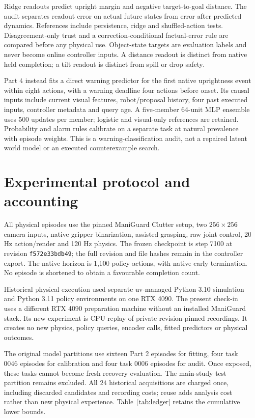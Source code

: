 \documentclass[sigconf,dvipsnames]{acmart}
\begin{document}
Ridge readouts predict upright margin and negative target-to-goal distance. The
audit separates readout error on actual future states from error after predicted
dynamics. References include persistence, ridge and shuffled-action tests.
Disagreement-only trust and a correction-conditional factual-error rule are compared
before any physical use. Object-state targets are evaluation labels and never
become online controller inputs. A distance readout is distinct from native held
completion; a tilt readout is distinct from spill or drop safety.

Part 4 instead fits a direct warning predictor for the first native uprightness
event within eight actions, with a warning deadline four actions before onset.
Its causal inputs include current visual features, robot/proposal history, four
past executed inputs, controller metadata and query age. A five-member 64-unit
MLP ensemble uses 500 updates per member; logistic and visual-only references are
retained. Probability and alarm rules calibrate on a separate task at natural
prevalence with episode weights. This is a warning-classification audit, not a
repaired latent world model or an executed counterexample search.

\section{Experimental protocol and accounting}
All physical episodes use the pinned ManiGuard Clutter setup, two $256\times256$
camera inputs, native gripper binarization, assisted grasping, raw joint control,
20 Hz action/render and 120 Hz physics. The frozen checkpoint is step 7100 at
revision \texttt{f572e33bdb49}; the full revision and file hashes remain in the
controller export. The native horizon is 1,100 policy actions, with native early
termination. No episode is shortened to obtain a favourable completion count.

Historical physical execution used separate uv-managed Python 3.10 simulation
and Python 3.11 policy environments on one RTX 4090. The present check-in uses a
different RTX 4090 preparation machine without an installed ManiGuard stack. Its
new experiment is CPU replay of private revision-pinned recordings. It creates no
new physics, policy queries, encoder calls, fitted predictors or physical outcomes.

The original model partitions use sixteen Part 2 episodes for fitting, four task
0046 episodes for calibration and four task 0006 episodes for audit. Once exposed,
these tasks cannot become fresh recovery evaluation. The main-study test partition
remains excluded. All 24 historical acquisitions are charged once, including
discarded candidates and recording costs; reuse adds analysis cost rather than
new physical experience. Table~\ref{tab:ledger} retains the cumulative lower bounds.
\end{document}
